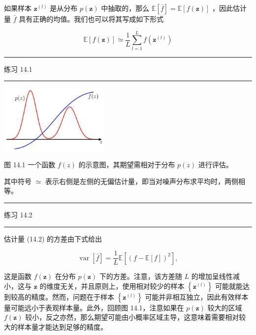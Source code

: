 \documentclass[10pt]{article}
\newcommand{\HRule}{\begin{center}\rule{0.9\linewidth}{0.2mm}\end{center}}
\begin{document}
如果样本 \({\mathbf{z}}^{\left( l\right) }\) 是从分布 \(p\left( \mathbf{z}\right)\) 中抽取的，那么 \(\mathbb{E}\left\lbrack  \bar{f}\right\rbrack   = \mathbb{E}\left\lbrack  {f\left( \mathbf{z}\right) }\right\rbrack\) ，因此估计量 \(\bar{f}\) 具有正确的均值。我们也可以将其写成如下形式

\[
\mathbb{E}\left\lbrack  {f\left( \mathbf{z}\right) }\right\rbrack   \simeq  \frac{1}{L}\mathop{\sum }\limits_{{l = 1}}^{L}f\left( {\mathbf{z}}^{\left( l\right) }\right)  \tag{14.3}
\]

\HRule

练习 14.1

\HRule

\begin{center}
\includegraphics[max width=0.4\textwidth]{images/0194e279-9b28-703a-88f4-c3ac21e2010d_449_1008_1629_543_343_0.jpg}
\end{center}
\hspace*{3em} 

图 14.1 一个函数 \(f\left( z\right)\) 的示意图，其期望需相对于分布 \(p\left( z\right)\) 进行评估。

其中符号 \(\simeq\) 表示右侧是左侧的无偏估计量，即当对噪声分布求平均时，两侧相等。

\HRule

练习 14.2

\HRule

估计量 (14.2) 的方差由下式给出

\[
\operatorname{var}\left\lbrack  \bar{f}\right\rbrack   = \frac{1}{L}\mathbb{E}\left\lbrack  {\left( f - \mathbb{E}\left\lbrack  f\right\rbrack  \right) }^{2}\right\rbrack  , \tag{14.4}
\]

这是函数 \(f\left( \mathbf{z}\right)\) 在分布 \(p\left( \mathbf{z}\right)\) 下的方差。注意，该方差随 \(L\) 的增加呈线性减小，这与 \(\mathbf{z}\) 的维度无关，并且原则上，使用相对较少的样本 \(\left\{  {\mathbf{z}}^{\left( l\right) }\right\}\) 可能就能达到较高的精度。然而，问题在于样本 \(\left\{  {\mathbf{z}}^{\left( l\right) }\right\}\) 可能并非相互独立，因此有效样本量可能远小于表观样本量。此外，回顾图 14.1，注意如果在 \(p\left( \mathbf{z}\right)\) 较大的区域 \(f\left( \mathbf{z}\right)\) 较小，反之亦然，那么期望可能由小概率区域主导，这意味着需要相对较大的样本量才能达到足够的精度。
\end{document}

